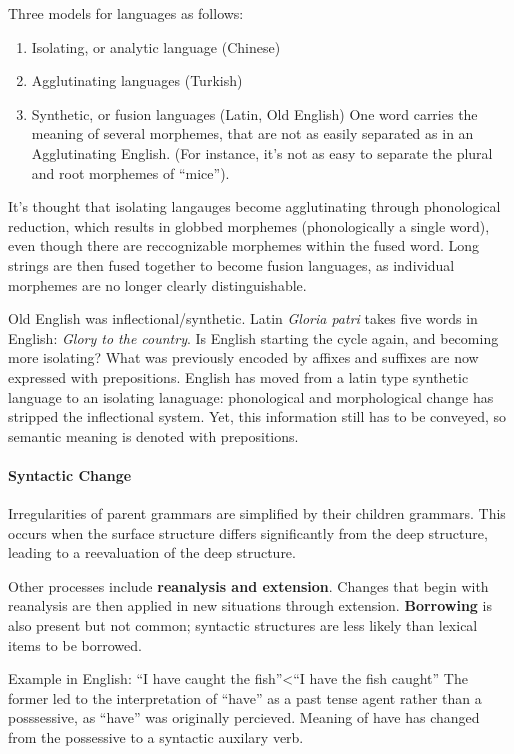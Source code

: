 \documentclass{exam}
\begin{document}
    Three models for languages as follows: 
\begin{enumerate}
    \item Isolating, or analytic language (Chinese)

    \item Agglutinating languages (Turkish)

    \item Synthetic, or fusion languages (Latin, Old English) One word carries the meaning of several morphemes, that are not as easily separated as in an Agglutinating English. 
(For instance, it's not as easy to separate the plural and root morphemes of ``mice''). 

\end{enumerate}
It's thought that isolating langauges become agglutinating through phonological reduction, which results in globbed morphemes (phonologically a single word), even though there are reccognizable morphemes within the fused word. 
Long strings are then fused together to become fusion languages, as individual morphemes are no longer clearly distinguishable. 

Old English was inflectional/synthetic. Latin \textit{Gloria patri} takes five words in English: \textit{Glory to the country}. 
Is English starting the cycle again, and becoming more isolating? 
What was previously encoded by affixes and suffixes are now expressed with prepositions.
English has moved from a latin type synthetic language to an isolating lanaguage: phonological and morphological change has stripped the inflectional system.
Yet, this information still has to be conveyed, so semantic meaning is denoted with prepositions. 




\paragraph{Syntactic Change}
Irregularities of parent grammars are simplified by their children grammars. 
This occurs when the surface structure differs significantly from the deep structure, leading to a reevaluation of the deep structure. 


Other processes include \textbf{reanalysis and extension}. 
Changes that begin with reanalysis are then applied in new situations through extension. 
\textbf{Borrowing} is also present but not common; syntactic structures are less likely than lexical items to be borrowed. 


Example in English:
``I have caught the fish''<``I have the fish caught''
The former led to the interpretation of ``have'' as a past tense agent rather than a posssessive, as ``have'' was originally percieved. 
Meaning of have has changed from the possessive to a syntactic auxilary verb. 
\end{document}
